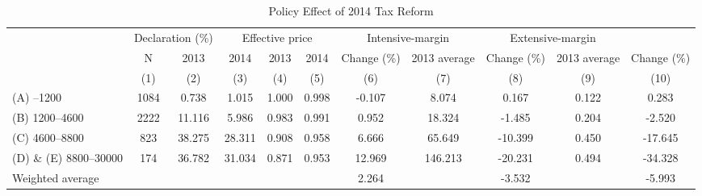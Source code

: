 \begin{table}

\caption{\label{tab:policy-effect}Policy Effect of 2014 Tax Reform}
\centering
\fontsize{7}{9}\selectfont
\begin{threeparttable}
\begin{tabular}[t]{>{\raggedright\arraybackslash}p{10em}cccccccccc}
\toprule
\multicolumn{2}{c}{ } & \multicolumn{2}{c}{Declaration (\%)} & \multicolumn{3}{c}{Effective price} & \multicolumn{2}{c}{Intensive-margin} & \multicolumn{2}{c}{Extensive-margin} \\
\cmidrule(l{3pt}r{3pt}){3-4} \cmidrule(l{3pt}r{3pt}){5-7} \cmidrule(l{3pt}r{3pt}){8-9} \cmidrule(l{3pt}r{3pt}){10-11}
\multicolumn{1}{c}{2013 Income bracket} & \multicolumn{1}{c}{N} & \multicolumn{1}{c}{2013} & \multicolumn{1}{c}{2014} & \multicolumn{1}{c}{2013} & \multicolumn{1}{c}{2014} & \multicolumn{1}{c}{Change (\%)} & \multicolumn{1}{c}{2013 average} & \multicolumn{1}{c}{Change (\%)} & \multicolumn{1}{c}{2013 average} & \multicolumn{1}{c}{Change (\%)} \\
\cmidrule(l{3pt}r{3pt}){1-1} \cmidrule(l{3pt}r{3pt}){2-2} \cmidrule(l{3pt}r{3pt}){3-3} \cmidrule(l{3pt}r{3pt}){4-4} \cmidrule(l{3pt}r{3pt}){5-5} \cmidrule(l{3pt}r{3pt}){6-6} \cmidrule(l{3pt}r{3pt}){7-7} \cmidrule(l{3pt}r{3pt}){8-8} \cmidrule(l{3pt}r{3pt}){9-9} \cmidrule(l{3pt}r{3pt}){10-10} \cmidrule(l{3pt}r{3pt}){11-11}
 & (1) & (2) & (3) & (4) & (5) & (6) & (7) & (8) & (9) & (10)\\
\midrule
(A) --1200 & 1084 & 0.738 & 1.015 & 1.000 & 0.998 & -0.107 & 8.074 & 0.167 & 0.122 & 0.283\\
(B) 1200--4600 & 2222 & 11.116 & 5.986 & 0.983 & 0.991 & 0.952 & 18.324 & -1.485 & 0.204 & -2.520\\
(C) 4600--8800 & 823 & 38.275 & 28.311 & 0.908 & 0.958 & 6.666 & 65.649 & -10.399 & 0.450 & -17.645\\
(D) \& (E) 8800--30000 & 174 & 36.782 & 31.034 & 0.871 & 0.953 & 12.969 & 146.213 & -20.231 & 0.494 & -34.328\\
Weighted average &  &  &  &  &  & 2.264 &  & -3.532 &  & -5.993\\
\bottomrule
\end{tabular}
\begin{tablenotes}

\end{tablenotes}
\end{threeparttable}
\end{table}
